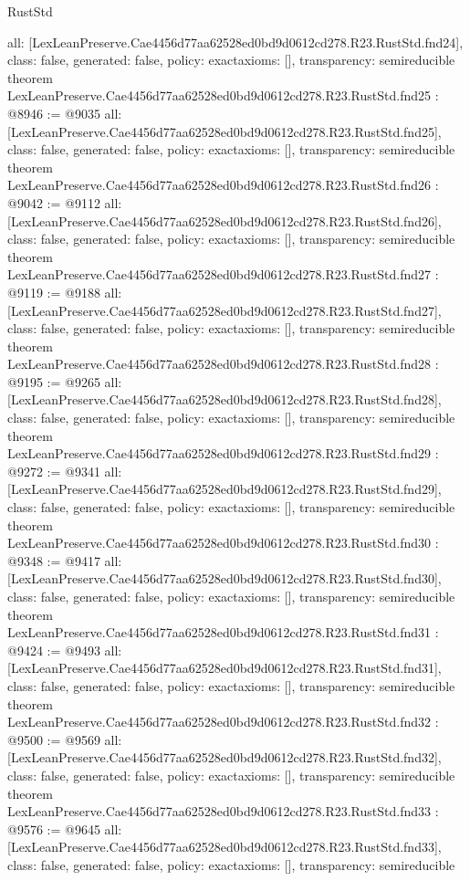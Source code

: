 \begin{lexlean}{RustStd}
\begin{coremodule}
{  all: [LexLeanPreserve.Cae4456d77aa62528ed0bd9d0612cd278.R23.RustStd.fnd24],
  class: false,
  generated: false,
  policy: exact{axioms: []},
  transparency: semireducible
}
theorem LexLeanPreserve.Cae4456d77aa62528ed0bd9d0612cd278.R23.RustStd.fnd25 : @8946 := @9035 {
  all: [LexLeanPreserve.Cae4456d77aa62528ed0bd9d0612cd278.R23.RustStd.fnd25],
  class: false,
  generated: false,
  policy: exact{axioms: []},
  transparency: semireducible
}
theorem LexLeanPreserve.Cae4456d77aa62528ed0bd9d0612cd278.R23.RustStd.fnd26 : @9042 := @9112 {
  all: [LexLeanPreserve.Cae4456d77aa62528ed0bd9d0612cd278.R23.RustStd.fnd26],
  class: false,
  generated: false,
  policy: exact{axioms: []},
  transparency: semireducible
}
theorem LexLeanPreserve.Cae4456d77aa62528ed0bd9d0612cd278.R23.RustStd.fnd27 : @9119 := @9188 {
  all: [LexLeanPreserve.Cae4456d77aa62528ed0bd9d0612cd278.R23.RustStd.fnd27],
  class: false,
  generated: false,
  policy: exact{axioms: []},
  transparency: semireducible
}
theorem LexLeanPreserve.Cae4456d77aa62528ed0bd9d0612cd278.R23.RustStd.fnd28 : @9195 := @9265 {
  all: [LexLeanPreserve.Cae4456d77aa62528ed0bd9d0612cd278.R23.RustStd.fnd28],
  class: false,
  generated: false,
  policy: exact{axioms: []},
  transparency: semireducible
}
theorem LexLeanPreserve.Cae4456d77aa62528ed0bd9d0612cd278.R23.RustStd.fnd29 : @9272 := @9341 {
  all: [LexLeanPreserve.Cae4456d77aa62528ed0bd9d0612cd278.R23.RustStd.fnd29],
  class: false,
  generated: false,
  policy: exact{axioms: []},
  transparency: semireducible
}
theorem LexLeanPreserve.Cae4456d77aa62528ed0bd9d0612cd278.R23.RustStd.fnd30 : @9348 := @9417 {
  all: [LexLeanPreserve.Cae4456d77aa62528ed0bd9d0612cd278.R23.RustStd.fnd30],
  class: false,
  generated: false,
  policy: exact{axioms: []},
  transparency: semireducible
}
theorem LexLeanPreserve.Cae4456d77aa62528ed0bd9d0612cd278.R23.RustStd.fnd31 : @9424 := @9493 {
  all: [LexLeanPreserve.Cae4456d77aa62528ed0bd9d0612cd278.R23.RustStd.fnd31],
  class: false,
  generated: false,
  policy: exact{axioms: []},
  transparency: semireducible
}
theorem LexLeanPreserve.Cae4456d77aa62528ed0bd9d0612cd278.R23.RustStd.fnd32 : @9500 := @9569 {
  all: [LexLeanPreserve.Cae4456d77aa62528ed0bd9d0612cd278.R23.RustStd.fnd32],
  class: false,
  generated: false,
  policy: exact{axioms: []},
  transparency: semireducible
}
theorem LexLeanPreserve.Cae4456d77aa62528ed0bd9d0612cd278.R23.RustStd.fnd33 : @9576 := @9645 {
  all: [LexLeanPreserve.Cae4456d77aa62528ed0bd9d0612cd278.R23.RustStd.fnd33],
  class: false,
  generated: false,
  policy: exact{axioms: []},
  transparency: semireducible
}
\end{coremodule}
\end{lexlean}
